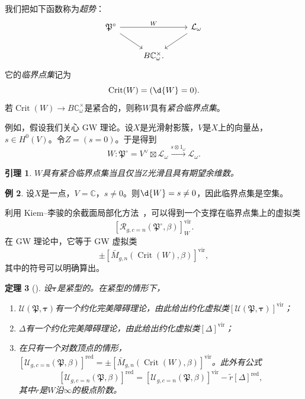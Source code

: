 \documentclass{amsart}
\newtheorem{thm}{定理}[section]
\newtheorem{lem}[thm]{引理}
\theoremstyle{definition}
\newtheorem{exm}[thm]{例}
\theoremstyle{remark}
\theoremstyle{plain}
\theoremstyle{definition}
\theoremstyle{remark}
\newcommand{\C}{\mathbb{C}}
\newcommand{\mc}[1]{\mathcal{#1}}
\newcommand{\mf}[1]{\mathfrak{#1}}
\newcommand{\mr}[1]{\mathrm{#1}}
\newcommand{\on}[1]{\operatorname{#1}}
\newcommand{\1}{\mathbf{1}}
\newcommand{\2}{\mathbf{2}}
\newcommand{\3}{\mathbf{3}}
\newcommand{\vir}{\mr{vir}}
\begin{document}
我们把如下函数称为\textit{超势}：
\begin{equation*}
\begin{tikzcd}
    \mf{P}^{\circ} \ar{rr}{W} \ar{dr} && \mc{L}_{\omega} \ar{dl} \\
    & B \C_{\omega}^{\times}.
\end{tikzcd}
\end{equation*}
它的\textit{临界点集}记为
\[ \on{Crit}(W) = (\d{W} = 0). \]
若\(\on{Crit}(W) \to B\C_{\omega}^{\times}\)是紧合的，则称\(W\)具有\textit{紧合临界点集}。

例如，假设我们关心 GW 理论。设\(X\)是光滑射影簇，\(V\)是\(X\)上的向量丛，\(s \in H^0(V)\)。令\(Z = (s = 0)\)。于是得到
\[ W \colon \mf{P}^{\circ} = V^{\vee} \boxtimes \mc{L}_{\omega} \xrightarrow{s \otimes 1_{\omega}} \mc{L}_{\omega}. \]

\begin{lem}
    \(W\)具有紧合临界点集当且仅当\(Z\)光滑且具有期望余维数。
\end{lem}

\begin{exm}
    设\(X\)是一点，\(V = \C\)，\(s \neq 0\)。则\(\d{W} = s \neq 0\)，因此临界点集是空集。
\end{exm}

利用 Kiem--李骏的余截面局部化方法~\cite{KiemLi2013}，可以得到一个支撑在临界点集上的虚拟类
\[ [\mc{R}_{g, c=n}(\mf{P}^{\circ}, \beta)]_W^{\vir}. \]
在 GW 理论中，它等于 GW 虚拟类
\[ \pm [\bar{M}_{g,n}(\on{Crit}(W), \beta)]^{\vir}, \]
其中的符号可以明确算出。

\begin{thm}[{\cite{CJR2021,CJW2021}}]
    设\(\bm{\tau}\)是紧型的。在紧型的情形下，
    \begin{enumerate}
        \item \(\mc{U}(\mf{P}, \bm{\tau})\)有一个约化完美障碍理论，由此给出约化虚拟类\([\mc{U}(\mf{P}, \bm{\tau})]^{\vir}\)；
        \item \(\Delta\)有一个约化完美障碍理论，由此给出约化虚拟类\([\Delta]^{\vir}\)；
        \item 在只有一个对数顶点的情形，\([\mc{U}_{g, c=n}(\mf{P}, \beta)]^{\on{red}} = \pm [\bar{M}_{g,n}(\on{Crit}(W), \beta)]^{\vir}\)。此外有公式
            \[ [\mc{U}_{g, c=n}(\mf{P}, \beta)]^{\on{red}} = [\mc{U}_{g, c=n}(\mf{P}, \beta)]^{\vir} - \tilde{r} [\Delta]^{\on{red}}, \]
            其中\(\tilde{r}\)是\(W\)沿\(\infty\)的极点阶数。
    \end{enumerate}
\end{thm}
\end{document}
